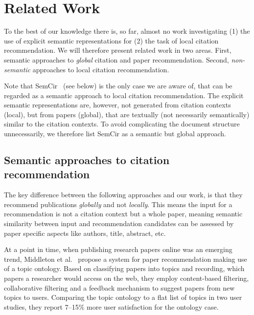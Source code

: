 \chapter{Related Work}\label{chap:relatedwork}

To the best of our knowledge there is, so far, almost no work investigating (1) the use of explicit semantic representations for (2) the task of local citation recommendation. We will therefore present related work in two areas. First, semantic approaches to \emph{global} citation and paper recommendation. Second, \emph{non-semantic} approaches to local citation recommendation.

Note that SemCir~\cite{Zarrinkalam2013} (see below) is the only case we are aware of, that can be regarded as a semantic approach to local citation recommendation. The explicit semantic representations are, however, not generated from citation contexts (local), but from papers (global), that are textually (not necessarily semantically) similar to the citation contexts. To avoid complicating the document structure unnecessarily, we therefore list SemCir as a semantic but global approach.

\section{Semantic approaches to citation recommendation}

The key difference between the following approaches and our work, is that they recommend publications \emph{globally} and not \emph{locally}. This means the input for a recommendation is not a citation context but a whole paper, meaning semantic similarity between input and recommendation candidates can be assessed by paper specific aspects like authors, title, abstract, etc.

At a point in time, when publishing research papers online was an emerging trend, Middleton et al.~\cite{Middleton2001} propose a system for paper recommendation making use of a topic ontology. Based on classifying papers into topics and recording, which papers a researcher would access on the web, they employ content-based filtering, collaborative filtering and a feedback mechanism to suggest papers from new topics to users. Comparing the topic ontology to a flat list of topics in two user studies, they report 7--15\% more user satisfaction for the ontology case.

